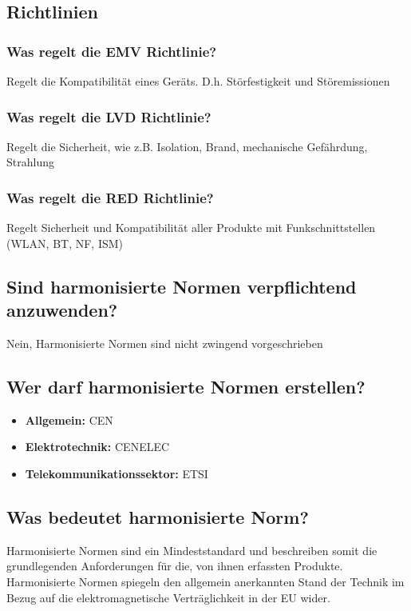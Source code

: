 \subsection{Richtlinien}
\subsubsection{Was regelt die EMV Richtlinie?}
Regelt die Kompatibilität eines Geräts. D.h. Störfestigkeit und Störemissionen

\subsubsection{Was regelt die LVD Richtlinie?}
Regelt die Sicherheit, wie z.B. Isolation, Brand, mechanische Gefährdung, Strahlung

\subsubsection{Was regelt die RED Richtlinie?}
Regelt Sicherheit und Kompatibilität aller Produkte mit Funkschnittstellen (WLAN, BT, NF, ISM)

\subsection{Sind harmonisierte Normen verpflichtend anzuwenden?}
Nein, Harmonisierte Normen sind nicht zwingend vorgeschrieben

\subsection{Wer darf harmonisierte Normen erstellen?}
\begin{itemize}
  \item \textbf{Allgemein:} CEN
  \item \textbf{Elektrotechnik:} CENELEC
  \item \textbf{Telekommunikationssektor:} ETSI
\end{itemize}

\subsection{Was bedeutet harmonisierte Norm?}
Harmonisierte Normen sind ein Mindeststandard und beschreiben somit die grundlegenden Anforderungen für die, von ihnen erfassten Produkte.\p
Harmonisierte Normen spiegeln den allgemein anerkannten Stand der Technik im Bezug auf die elektromagnetische Verträglichkeit in der EU wider.

